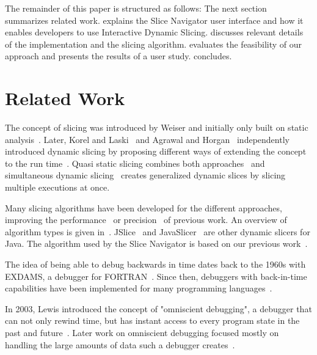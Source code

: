 \documentclass[
			english,
			]{elsarticle}
\begin{document}
The remainder of this paper is structured as follows:
The next section summarizes related work.
 explains the Slice Navigator user interface and how it enables developers to use Interactive Dynamic Slicing.
 discusses relevant details of the implementation and the slicing algorithm.
 evaluates the feasibility of our approach and presents the results of a user study.
 concludes.

\section{Related Work}

The concept of slicing was introduced by Weiser and initially only built on static analysis~\cite{weiser_programmers_1982, weiser_program_1981}.
Later, Korel and Laski~\cite{korel_dynamic_1990} and Agrawal and Horgan~\cite{agrawal_dynamic_1990} independently introduced dynamic slicing by proposing different ways of extending the concept to the run time~\cite{binkley_theoretical_2006}.
Quasi static slicing combines both approaches~\cite{venkatesh_semantic_1991} and simultaneous dynamic slicing~\cite{hall_automatic_1995} creates generalized dynamic slices by slicing multiple executions at once.

Many slicing algorithms have been developed for the different approaches, improving the performance~\cite{reps_speeding_1994} or precision~\cite{kumar_better_2002, zhang_precise_2003} of previous work.
An overview of algorithm types is given in~\cite{korel_dynamic_1998}.
JSlice~\cite{wang_dynamic_2008} and JavaSlicer~\cite{hammacher_08_design_and_implementation} are other dynamic slicers for Java.
The algorithm used by the Slice Navigator is based on our previous work~\cite{treffer_dynamic_2014}.

The idea of being able to debug backwards in time dates back to the 1960s with EXDAMS, a debugger for FORTRAN~\cite{balzer_exdams_1969}.
Since then, debuggers with back-in-time capabilities have been implemented for many programming languages~\cite{feldman_igor_1988, agrawal_debugging_1993, lieberman_zstep_1997, hofer_design_2006}.

In 2003, Lewis introduced the concept of "omniscient debugging", a debugger that can not only rewind time, but has instant access to every program state in the past and future~\cite{lewis_debugging_2003}.
Later work on omniscient debugging focused mostly on handling the large amounts of data such a debugger creates~\cite{pothier_scalable_2007, lienhard_practical_2008}.
\end{document}
